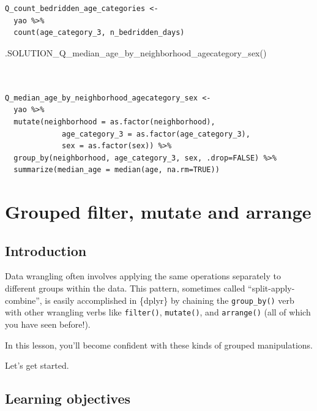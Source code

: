 \documentclass[
  letterpaper,
  DIV=11,
  numbers=noendperiod]{scrreprt}
\newenvironment{Shaded}{\begin{snugshade}}{\end{snugshade}}
\newcommand{\FunctionTok}[1]{\textcolor[rgb]{0.28,0.35,0.67}{#1}}
\newcommand{\NormalTok}[1]{\textcolor[rgb]{0.00,0.23,0.31}{#1}}
\begin{document}
\begin{verbatim}


Q_count_bedridden_age_categories <- 
  yao %>% 
  count(age_category_3, n_bedridden_days)
\end{verbatim}

\begin{Shaded}
\begin{Highlighting}[]
\FunctionTok{.SOLUTION\_Q\_median\_age\_by\_neighborhood\_agecategory\_sex}\NormalTok{()}
\end{Highlighting}
\end{Shaded}

\begin{verbatim}


Q_median_age_by_neighborhood_agecategory_sex <- 
  yao %>% 
  mutate(neighborhood = as.factor(neighborhood),
             age_category_3 = as.factor(age_category_3),
             sex = as.factor(sex)) %>%
  group_by(neighborhood, age_category_3, sex, .drop=FALSE) %>%
  summarize(median_age = median(age, na.rm=TRUE))
\end{verbatim}


\hypertarget{grouped-filter-mutate-and-arrange}{%
\chapter{Grouped filter, mutate and
arrange}\label{grouped-filter-mutate-and-arrange}}

\hypertarget{introduction-12}{%
\section{Introduction}\label{introduction-12}}

Data wrangling often involves applying the same operations separately to
different groups within the data. This pattern, sometimes called
``split-apply-combine'', is easily accomplished in \{dplyr\} by chaining
the \texttt{group\_by()} verb with other wrangling verbs like
\texttt{filter()}, \texttt{mutate()}, and \texttt{arrange()} (all of
which you have seen before!).

In this lesson, you'll become confident with these kinds of grouped
manipulations.

Let's get started.

\hypertarget{learning-objectives-11}{%
\section{Learning objectives}\label{learning-objectives-11}}
\end{document}
